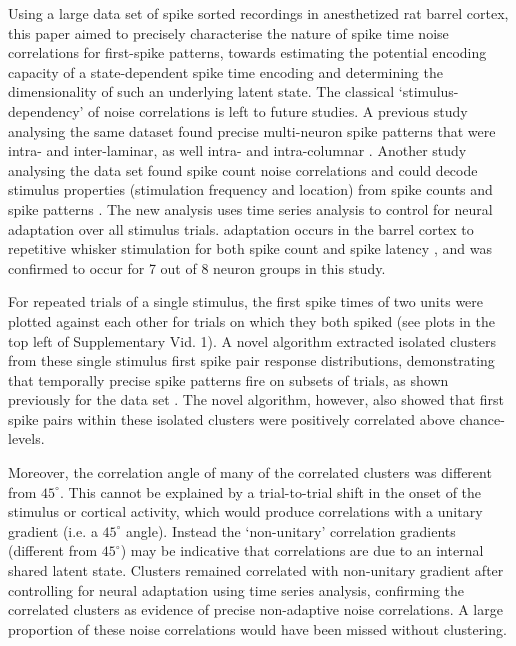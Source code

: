 \documentclass{article}
\begin{document}
Using a large data set of spike sorted recordings in anesthetized rat barrel cortex, this paper aimed to precisely characterise the nature of spike time noise correlations for first-spike patterns, towards estimating the potential encoding capacity of a state-dependent spike time encoding and determining the dimensionality of such an underlying latent state. The classical `stimulus-dependency' of noise correlations is left to future studies. A previous study analysing the same dataset found precise multi-neuron spike patterns that were intra- and inter-laminar, as well intra- and intra-columnar \cite{reyes2014laminar}. Another study analysing the data set found spike count noise correlations and could decode stimulus properties (stimulation frequency and location) from spike counts and spike patterns \cite{reyes2015high}. The new analysis uses time series analysis to control for neural adaptation over all stimulus trials. adaptation occurs in the barrel cortex to repetitive whisker stimulation for both spike count \cite{ahissar2000transformation, ahissar2001temporal, kheradpezhouh2017response, khatri2009stimulus, martin2014tactile, barros2019response} and spike latency \cite{ahissar2000transformation, ahissar2001temporal, kheradpezhouh2017response}, and was confirmed to occur for 7 out of 8 neuron groups in this study. 


For repeated trials of a single stimulus, the first spike times of two units were plotted against each other for trials on which they both spiked (see plots in the top left of Supplementary Vid. 1). A novel algorithm extracted isolated clusters from these single stimulus first spike pair response distributions, demonstrating that temporally precise spike patterns fire on subsets of trials, as shown previously for the data set \cite{reyes2014laminar}. The novel algorithm, however, also showed that first spike pairs within these isolated clusters were positively correlated above chance-levels. 

Moreover, the correlation angle of many of the correlated clusters was different from $45^{\circ}$. This cannot be explained by a trial-to-trial shift in the onset of the stimulus or cortical activity, which would produce correlations with a unitary gradient (i.e. a $45^{\circ}$ angle). Instead the `non-unitary' correlation gradients (different from $45^{\circ}$) may be indicative that correlations are due to an internal shared latent state. Clusters remained correlated with non-unitary gradient after controlling for neural adaptation using time series analysis, confirming the correlated clusters as evidence of precise non-adaptive noise correlations. A large proportion of these noise correlations would have been missed without clustering. 
\end{document}
